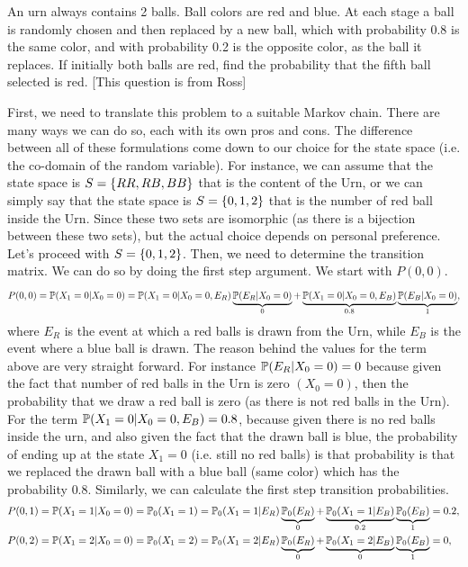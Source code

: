 \begin{problem}
	An urn always contains 2 balls. Ball colors are red and blue. At each stage a ball  is randomly chosen and then replaced by a new ball, which with probability 0.8 is the same color, and with probability 0.2 is the opposite color, as the ball it replaces. If initially both balls are red, find the probability that the fifth ball selected is red. [This question is from Ross]
	\begin{solution}
		First, we need to translate this problem to a suitable Markov chain. There are many ways we can do so, each with its own pros and cons. The difference between all of these formulations come down to our choice for the state space (i.e. the co-domain of the random variable). For instance, we can assume that the state space is $S = \{RR, RB, BB\}$ that is the content of the Urn, or we can simply say that the state space is $S = \{0,1,2\}$ that is the number of red ball inside the Urn. Since these two sets are isomorphic (as there is a bijection between these two sets), but the actual choice depends on personal preference. Let's proceed with $S = \{0,1,2\}$. Then, we need to determine the transition matrix. We can do so by doing the first step argument. We start with $P(0,0)$. 
		\[ P(0,0) = \mathbb{P}(X_1 = 0|X_0 =0) = \mathbb{P}(X_1=0|X_0=0,E_R)\underbrace{\mathbb{P}(E_R|X_0=0)}_{0} + \underbrace{\mathbb{P}(X_1=0|X_0=0,E_B)}_{0.8}\underbrace{\mathbb{P}(E_B|X_0=0)}_{1}, \]
		where $E_R$ is the event at which a red balls is drawn from the Urn, while $E_B$ is the event where a blue ball is drawn. The reason behind the values for the term above are very straight forward. For instance $\mathbb{P}(E_R|X_0=0)=0$ because given the fact that number of red balls in the Urn is zero $(X_0 = 0)$, then the probability that we draw a red ball is zero (as there is not red balls in the Urn). For the term $\mathbb{P}(X_1=0|X_0=0,E_B) = 0.8$, because given there is no red balls inside the urn, and also given the fact that the drawn ball is blue, the probability of ending up at the state $X_1=0$ (i.e. still no red balls) is that probability is that we replaced the drawn ball with a blue ball (same color) which has the probability $0.8$. Similarly, we can calculate the first step transition probabilities. 
		\begin{align*}
			&P(0,1) = \prob(X_1=1|X_0=0) = \prob_0(X_1=1) = \prob_0(X_1=1|E_R)\underbrace{\prob_0(E_R)}_{0} + \underbrace{\prob_0(X_1=1|E_B)}_{0.2}\underbrace{\prob_0(E_B)}_{1} = 0.2,\\
			&P(0,2) = \prob(X_1=2|X_0=0) = \prob_0(X_1=2) = \prob_0(X_1=2|E_R)\underbrace{\prob_0(E_R)}_{0} + \underbrace{\prob_0(X_1=2|E_B)}_{0}\underbrace{\prob_0(E_B)}_{1} = 0,\\

\end{align*}
\end{solution}
\end{problem}
